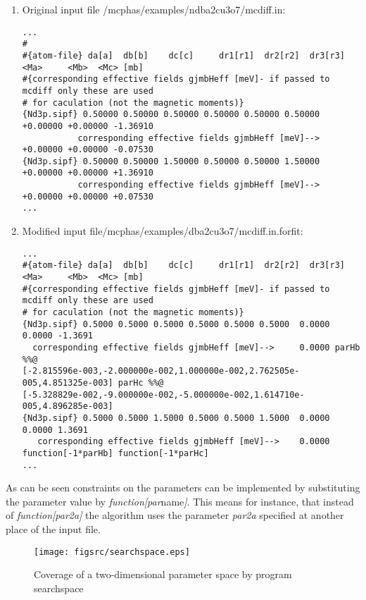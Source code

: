 \begin{enumerate}
\item Original input file {\prg /mcphas/examples/ndba2cu3o7/mcdiff.in}:
{\footnotesize
\begin{verbatim}
...
#
#{atom-file} da[a]  db[b]    dc[c]     dr1[r1]  dr2[r2]  dr3[r3]   <Ma>     <Mb>  <Mc> [mb]
#{corresponding effective fields gjmbHeff [meV]- if passed to mcdiff only these are used 
# for caculation (not the magnetic moments)}
{Nd3p.sipf} 0.50000 0.50000 0.50000 0.50000 0.50000 0.50000 +0.00000 +0.00000 -1.36910  
           corresponding effective fields gjmbHeff [meV]--> +0.00000 +0.00000 -0.07530
{Nd3p.sipf} 0.50000 0.50000 1.50000 0.50000 0.50000 1.50000 +0.00000 +0.00000 +1.36910  
           corresponding effective fields gjmbHeff [meV]--> +0.00000 +0.00000 +0.07530
...
\end{verbatim}
}

	
\item Modified input file{\prg /mcphas/examples/dba2cu3o7/mcdiff.in.forfit}: 
{\footnotesize
\begin{verbatim}
...
#{atom-file} da[a]  db[b]    dc[c]     dr1[r1]  dr2[r2]  dr3[r3]   <Ma>     <Mb>  <Mc> [mb]
#{corresponding effective fields gjmbHeff [meV]- if passed to mcdiff only these are used 
# for caculation (not the magnetic moments)}
{Nd3p.sipf} 0.5000 0.5000 0.5000 0.5000 0.5000 0.5000  0.0000 0.0000 -1.3691  
  corresponding effective fields gjmbHeff [meV]-->     0.0000 parHb %%@
[-2.815596e-003,-2.000000e-002,1.000000e-002,2.762505e-005,4.851325e-003] parHc %%@
[-5.328829e-002,-9.000000e-002,-5.000000e-002,1.614710e-005,4.896285e-003]
{Nd3p.sipf} 0.5000 0.5000 1.5000 0.5000 0.5000 1.5000  0.0000 0.0000 1.3691  
   corresponding effective fields gjmbHeff [meV]-->    0.0000 function[-1*parHb] function[-1*parHc]
...
\end{verbatim}
}

\end{enumerate}

As can be seen constraints on the parameters can be implemented by
substituting the parameter value by {\em function[par}name{\em ]}.
This means for instance, that instead of {\em function[par2a]} the algorithm
uses the parameter {\em par2a} specified at another place of the input file.

\begin{figure}[hb]%
\begin{center}\leavevmode
\texttt{[image: figsrc/searchspace.eps]}
\end{center}\label{searchspace}
\caption{Coverage of a two-dimensional parameter space by program {\prg searchspace}}
\end{figure}

